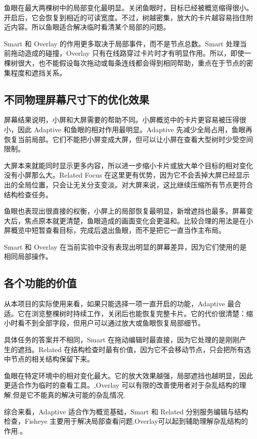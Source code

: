 \documentclass[11pt,a4paper,oneside,extrafontsizes]{memoir}
\begin{document}
鱼眼在最大两棵树中的局部变化最明显。关闭鱼眼时，目标已经被概览缩得很小。开启后，它会恢复到相近的可读宽度。不过，树越密集，放大的卡片越容易挡住附近内容。所以鱼眼适合解决临时看清某个局部的问题。

Smart 和 Overlay 的作用更多取决于局部事件，而不是节点总数。Smart 处理当前拖动造成的碰撞，Overlay 只有在线路穿过卡片时才有明显作用。所以，即使一棵树很大，也不能假设每次拖动或每条连线都会得到相同帮助，重点在于节点的密集程度和遮挡关系。

\subsection{不同物理屏幕尺寸下的优化效果}

屏幕结果说明，小屏和大屏需要的帮助不同。小屏概览中的卡片更容易被压得很小，因此 Adaptive 和鱼眼的相对作用最明显。Adaptive 先减少全局占用，鱼眼再恢复当前局部。它们不能把小屏变成大屏，但可以让小屏在查看大型树时少受空间限制。

大屏本来就能同时显示更多内容，所以进一步缩小卡片或放大单个目标的相对变化没有小屏那么大。Related Focus 在这里更有优势，因为它不会丢掉大屏已经显示出的全局位置，只会让无关分支变淡。对大屏来说，这比继续压缩所有节点更符合结构检查任务。

鱼眼也表现出很直接的权衡，小屏上的局部恢复最明显，新增遮挡也最多。屏幕变大后，焦点原本就更清楚，鱼眼造成的画面变化会更温和。比较合理的用法是在小屏概览中短暂查看目标，完成后退出鱼眼，而不是把它一直当作主布局。

Smart 和 Overlay 在当前实验中没有表现出明显的屏幕差异，因为它们使用的是相同局部操作。

\subsection{各个功能的价值}

从本项目的实际使用来看，如果只能选择一项一直开启的功能，Adaptive 最合适。它在浏览整棵树时持续工作，关闭后也能恢复完整卡片。它的代价很清楚：缩小时看不到全部字段，但用户可以通过放大或鱼眼恢复局部细节。

具体任务的答案并不相同，Smart 在拖动编辑时最直接，因为它处理的是刚刚产生的遮挡。Related 在结构检查时最有价值，因为它不会移动节点，只会把所有选中节点的相关结构保留下来。

鱼眼在特定环境中的相对变化最大。它的放大效果越强，局部遮挡也越明显，因此更适合作为临时的查看工具。,Overlay 可以有限的改善使用者对于杂乱结构的理解,但是它不能真的解决可能的杂乱情况.

综合来看，Adaptive 适合作为概览基础，Smart 和 Related 分别服务编辑与结构检查，Fisheye  主要用于解决局部查看问题,Overlay可以起到辅助理解杂乱结构的作用.。
\end{document}
